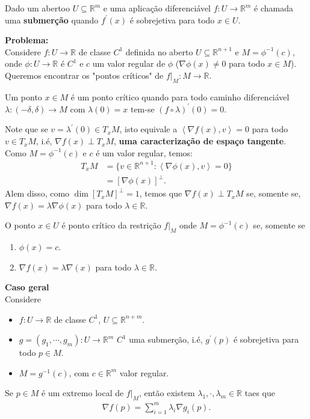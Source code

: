\begin{definition}[Submerção]
  Dado um abertoo $U\subseteq\mathbb{R}^{m}$ e uma aplicação diferenciável $f:U\to\mathbb{R}^{m}$ é chamada uma \textbf{submerção} quando $f^{\prime}(x)$ é sobrejetiva para todo $x\in U$. 
\end{definition}
\textbf{Problema:}\\
Considere $f:U\to\mathbb{R}$ de classe $C^{1}$ definida no aberto $U\subseteq \mathbb{R}^{n+1}$ e $M=\phi^{-1}(c)$, onde $\phi:U\to\mathbb{R}$ é $C^{1}$ e $c$ um valor regular de $\phi$ ($\nabla\phi(x)\neq 0$ para todo $x\in M$).\\
Queremos encontrar os "pontos críticos" de $f\big|_{M}:M\to\mathbb{R}$.
\begin{definition}
  Um ponto $x\in M$ é um ponto crítico quando para todo caminho diferenciável $\lambda:(-\delta,\delta)\to M$ com $\lambda(0)=x$ tem-se $(f\circ \lambda)^{\prime}(0)=0$. 
\end{definition}
\begin{note}
  Note que se $v=\lambda^{\prime}(0)\in T_{x}M$, isto equivale a $\left\langle \nabla f(x),v \right\rangle=0$ para todo $v\in T_{x}M$, i.é, $\nabla f(x)\perp T_{x}M$, \textbf{uma caracterização de espaço tangente}.\\
  Como $M=\phi^{-1}(c)$ e $c$ é um valor regular, temos:
  \begin{align*}
    T_{x}M&=\{v\in\mathbb{R}^{n+1}:\left\langle \nabla\phi(x),v \right\rangle=0\}\\
    &=\left[ \nabla\phi(x) \right]^{\perp}.
  \end{align*}
  Alem disso, como $\dim \left[ T_xM \right]^{\perp}=1$, temos que $\nabla f(x)\perp T_{x}M$ se, somente se, $\nabla f(x)=\lambda\nabla \phi(x)$ para todo $\lambda\in\mathbb{R}$. 
\end{note}
\begin{theorem}
  O ponto $x\in U$ é ponto crítico da restrição $f\big|_{M}$ onde $M=\phi^{-1}(c)$ se, somente se
  \begin{enumerate}
    \item $\phi(x)=c$.
    \item $\nabla f(x)=\lambda\nabla(x)$ para todo $\lambda\in\mathbb{R}$. 
  \end{enumerate}
  \textbf{Caso geral}\\
  Considere
  \begin{itemize}
    \item $f:U\to\mathbb{R}$ de classe $C^{1}$, $U\subseteq \mathbb{R}^{n+m}$.
    \item $g=(g_1,\cdots,g_m):U\to\mathbb{R}^{m}$ $C^{1}$ uma submerção, i.é, $g^{\prime}(p)$ é sobrejetiva para todo $p\in M$.
    \item $M=g^{-1}(c)$, com $c\in\mathbb{R}^{m}$ valor regular. 
  \end{itemize}
  Se $p\in M$ é um extremo local de $f\big|_{M}$, então existem $\lambda_{1},\cdot,\lambda_{m}\in\mathbb{R}$ taes que
  \begin{align*}
    \nabla f(p)=\sum_{i=1}^{m}\lambda_{i}\nabla g_{i}(p).
  \end{align*}
\end{theorem}
